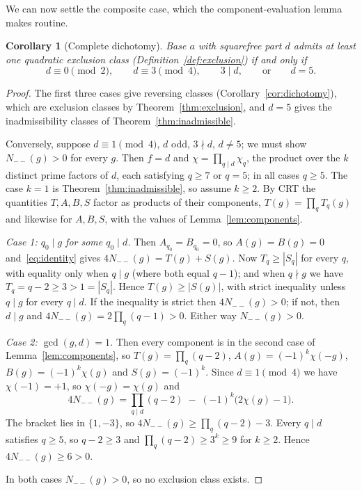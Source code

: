 \documentclass[11pt,reqno]{amsart}
\theoremstyle{plain}
\newtheorem{corollary}[theorem]{Corollary}
\theoremstyle{definition}
\begin{document}
We can now settle the composite case, which the component-evaluation lemma
makes routine.

\begin{corollary}[Complete dichotomy]
\label{cor:complete}
Base $a$ with squarefree part $d$ admits at least one quadratic exclusion
class (Definition~\ref{def:exclusion}) if and only if
\[
  d \equiv 0 \pmod 2, \qquad d \equiv 3 \pmod 4, \qquad 3 \mid d,
  \qquad\text{or}\qquad d = 5.
\]
\end{corollary}

\begin{proof}
The first three cases give reversing classes (Corollary~\ref{cor:dichotomy}),
which are exclusion classes by Theorem~\ref{thm:exclusion}, and $d = 5$ gives
the inadmissibility classes of Theorem~\ref{thm:inadmissible}.

Conversely, suppose $d \equiv 1 \pmod 4$, $d$ odd, $3 \nmid d$, $d \neq 5$; we
must show $N_{--}(g) > 0$ for every $g$. Then $f = d$ and $\chi = \prod_{q \mid
d} \chi_q$, the product over the $k$ distinct prime factors of $d$, each
satisfying $q \ge 7$ or $q = 5$; in all cases $q \ge 5$. The case $k = 1$ is
Theorem~\ref{thm:inadmissible}, so assume $k \ge 2$. By CRT the quantities
$T, A, B, S$ factor as products of their components, $T(g) = \prod_q T_q(g)$
and likewise for $A, B, S$, with the values of Lemma~\ref{lem:components}.

\emph{Case 1: $q_0 \mid g$ for some $q_0 \mid d$.} Then $A_{q_0} = B_{q_0} = 0$,
so $A(g) = B(g) = 0$ and~\eqref{eq:identity} gives $4N_{--}(g) = T(g) + S(g)$.
Now $T_q \ge |S_q|$ for every $q$, with equality only when $q \mid g$ (where
both equal $q-1$); and when $q \nmid g$ we have $T_q = q - 2 \ge 3 > 1 =
|S_q|$. Hence $T(g) \ge |S(g)|$, with strict inequality unless $q \mid g$ for
every $q \mid d$. If the inequality is strict then $4N_{--}(g) > 0$; if not,
then $d \mid g$ and $4N_{--}(g) = 2\prod_q (q-1) > 0$. Either way
$N_{--}(g) > 0$.

\emph{Case 2: $\gcd(g, d) = 1$.} Then every component is in the second case of
Lemma~\ref{lem:components}, so $T(g) = \prod_q (q-2)$,
$A(g) = (-1)^k \chi(-g)$, $B(g) = (-1)^k \chi(g)$ and $S(g) = (-1)^k$. Since
$d \equiv 1 \pmod 4$ we have $\chi(-1) = +1$, so $\chi(-g) = \chi(g)$ and
\[
  4 N_{--}(g) = \prod_{q \mid d} (q-2) \; - \; (-1)^k\bigl(2\chi(g) - 1\bigr).
\]
The bracket lies in $\{1, -3\}$, so $4N_{--}(g) \ge \prod_q (q-2) - 3$. Every
$q \mid d$ satisfies $q \ge 5$, so $q - 2 \ge 3$ and $\prod_q (q-2) \ge 3^k
\ge 9$ for $k \ge 2$. Hence $4N_{--}(g) \ge 6 > 0$.

In both cases $N_{--}(g) > 0$, so no exclusion class exists.
\end{proof}
\end{document}
